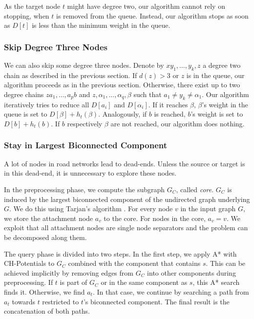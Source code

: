 \documentclass[a4paper,UKenglish,cleveref, autoref, thm-restate]{lipics-v2021}
\begin{document}
As the target node $t$ might have degree two, our algorithm cannot rely on stopping, when $t$ is removed from the queue.
Instead, our algorithm stops as soon as $D[t]$ is less than the minimum weight in the queue.

\subsubsection{Skip Degree Three Nodes}

We can also skip some degree three nodes.
Denote by $x y_1,\ldots, y_k, z$ a degree two chain as described in the previous section.
If $d(z) > 3$ or $z$ is in the queue, our algorithm proceeds as in the previous section.
Otherwise, there exist up to two degree chains $z a_1,\ldots,a_p b$ and $z,\alpha_1,\ldots,\alpha_q,\beta$ such that $a_1\neq y_k \neq \alpha_1$.
Our algorithm iteratively tries to reduce all $D[a_i]$ and $D[\alpha_i]$.
If it reaches $\beta$, $\beta$'s weight in the queue is set to $D[\beta]+h_t(\beta)$.
Analogously, if $b$ is reached, $b$'s weight is set to $D[b]+h_t(b)$.
If $b$ respectively $\beta$ are not reached, our algorithm does nothing.

\subsubsection{Stay in Largest Biconnected Component}\label{sec:largested-biconnected-component}

A lot of nodes in road networks lead to dead-ends.
Unless the source or target is in this dead-end, it is unnecessary to explore these nodes.

In the preprocessing phase, we compute the subgraph $G_C$, called \emph{core}.
$G_C$ is induced by the largest biconnected component of the undirected graph underlying $G$.
We do this using Tarjan's algorithm \cite{t-dfslg2-72}.
For every node $v$ in the input graph $G$, we store the attachment node $a_v$ to the core.
For nodes in the core, $a_v=v$.
We exploit that all attachment nodes are single node separators and the problem can be decomposed along them.

The query phase is divided into two steps.
In the first step, we apply A* with CH-Potentials to $G_C$ combined with the component that contains $s$.
This can be achieved implicitly by removing edges from $G_C$ into other components during preprocessing.
If $t$ is part of $G_C$ or in the same component as $s$, this A* search finds it.
Otherwise, we find $a_t$.
In that case, we continue by searching a path from $a_t$ towards $t$ restricted to $t$'s biconnected component.
The final result is the concatenation of both paths.
\end{document}

